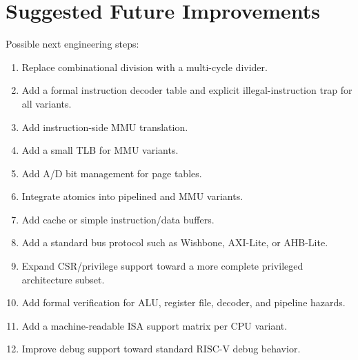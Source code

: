 \section{Suggested Future Improvements}

Possible next engineering steps:

\begin{enumerate}
\item Replace combinational division with a multi-cycle divider.
\item Add a formal instruction decoder table and explicit illegal-instruction trap for all variants.
\item Add instruction-side MMU translation.
\item Add a small TLB for MMU variants.
\item Add A/D bit management for page tables.
\item Integrate atomics into pipelined and MMU variants.
\item Add cache or simple instruction/data buffers.
\item Add a standard bus protocol such as Wishbone, AXI-Lite, or AHB-Lite.
\item Expand CSR/privilege support toward a more complete privileged architecture subset.
\item Add formal verification for ALU, register file, decoder, and pipeline hazards.
\item Add a machine-readable ISA support matrix per CPU variant.
\item Improve debug support toward standard RISC-V debug behavior.
\end{enumerate}

\bigskip
